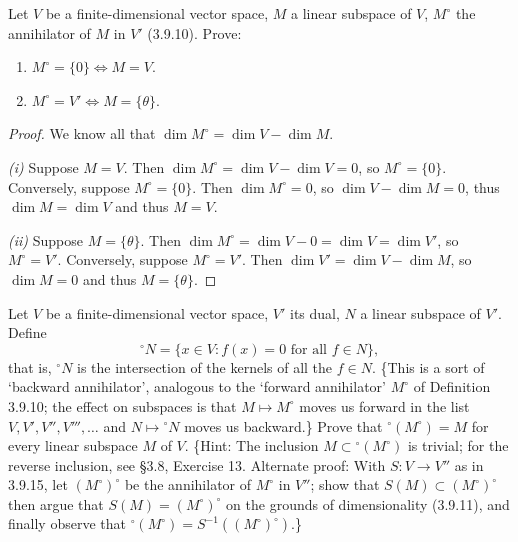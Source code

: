 \begin{tcolorbox}[title=Exercise 13, breakable]
    Let $V$ be a finite-dimensional vector space, $M$ a linear subspace of $V$, 
    $M^\circ$ the annihilator of $M$ in $V'$ (3.9.10). Prove:
    \begin{enumerate}
        \item[(i)] $M^\circ = \{0\} \Leftrightarrow M = V$.
        \item[(ii)] $M^\circ = V' \Leftrightarrow M = \{\theta\}$.
    \end{enumerate}
\end{tcolorbox}

\begin{proof}
    We know all that $\dim M^\circ = \dim V - \dim M$.

    \textit{(i)} Suppose $M = V$. Then $\dim M^\circ = \dim V - \dim V = 0$, so $M^\circ = \{0\}$.
    Conversely, suppose $M^\circ = \{0\}$. Then $\dim M^\circ = 0$, so $\dim V - \dim M = 0$, 
    thus $\dim M = \dim V$ and thus $M = V$.

    \textit{(ii)} Suppose $M = \{\theta\}$. Then $\dim M^\circ = \dim V - 0 = \dim V = \dim V'$, 
    so $M^\circ = V'$.
    Conversely, suppose $M^\circ = V'$. Then $\dim V' = \dim V - \dim M$, 
    so $\dim M = 0$ and thus $M = \{\theta\}$.
\end{proof}


\begin{tcolorbox}[title=Exercise 14, breakable]
    Let $V$ be a finite-dimensional vector space, $V'$ its dual, $N$ a linear 
    subspace of $V'$. Define
    \[{}^\circ N = \{x \in V : f(x) = 0 \text{ for all } f \in N\},\]
    that is, ${}^\circ N$ is the intersection of the kernels of all the $f \in N$. \{This is a 
    sort of `backward annihilator', analogous to the `forward annihilator' $M^\circ$ 
    of Definition 3.9.10; the effect on subspaces is that $M \mapsto M^\circ$ moves us 
    forward in the list $V, V', V'', V''', \ldots$ and $N \mapsto {}^\circ N$ moves us backward.\}
    Prove that ${}^\circ(M^\circ) = M$ for every linear subspace $M$ of $V$.
    \{Hint: The inclusion $M \subset {}^\circ(M^\circ)$ is trivial; for the reverse inclusion, see 
    \S 3.8, Exercise 13. Alternate proof: With $S : V \to V''$ as in 3.9.15, let 
    $(M^\circ)^\circ$ be the annihilator of $M^\circ$ in $V''$; show that $S(M) \subset (M^\circ)^\circ$ then 
    argue that $S(M) = (M^\circ)^\circ$ on the grounds of dimensionality (3.9.11), and 
    finally observe that ${}^\circ(M^\circ) = S^{-1}((M^\circ)^\circ)$.\}
\end{tcolorbox}

